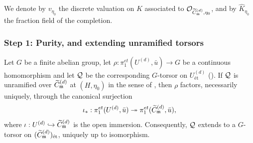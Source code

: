 We denote by $v_{\eta_0}$ the discrete valuation on $K$ associated to $\mathcal{O}_{\widetilde{C}_{\mathfrak{m}}^{(d)}, \eta_0}$,
and by $\widehat{K}_{\eta_0}$ the fraction field of the completion.

\subsubsection*{Step 1: Purity, and extending unramified torsors}

\begin{prop}\label{prop:extension_via_purity}
    Let $G$ be a finite abelian group, let $\rho : \pi_1^{et}(U^{(d)}, \bar{u}) \to G$ be a continuous
    homomorphism and let $\mathcal{Q}$ be the corresponding $G$-torsor on $U^{(d)}_{\text{\'et}}$
    ().
    If $\mathcal{Q}$ is unramified over $\widetilde{C}_{\mathfrak{m}}^{(d)}$ at $(H, \eta_0)$ in the sense of
    , then $\rho$ factors, necessarily uniquely, through the
    canonical surjection
    \[ \iota_* : \pi_1^{et}(U^{(d)}, \bar{u}) \twoheadrightarrow \pi_1^{et}(\widetilde{C}_{\mathfrak{m}}^{(d)}, \bar{u}), \]
    where $\iota : U^{(d)} \hookrightarrow \widetilde{C}_{\mathfrak{m}}^{(d)}$ is the open immersion.
    Consequently, $\mathcal{Q}$ extends to a $G$-torsor on $(\widetilde{C}_{\mathfrak{m}}^{(d)})_{\text{\'et}}$, uniquely up to isomorphism.
\end{prop}
